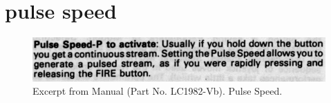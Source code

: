 \chapter{pulse speed} 
\label{sec:pulse_speed}
\lstset{style=6502Style}

\begin{figure}[H]
    \centering
    \begin{adjustbox}{width=10.5cm,margin=0cm}
      \includegraphics[width=12cm]{src/pulsespeed/pulsespeed.png}%
    \end{adjustbox}
    \caption{
      Excerpt from Manual (Part No. LC1982-Vb). Pulse Speed.
      }
\end{figure}



